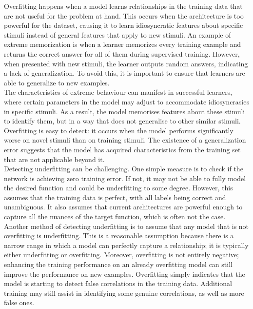 \noindent Overfitting happens when a model learns relationships in the training data that are not useful for the problem at hand. This occurs when the architecture is too powerful for the dataset, causing it to learn idiosyncratic features about specific stimuli instead of general features that apply to new stimuli. An example of extreme memorization is when a learner memorizes every training example and returns the correct answer for all of them during supervised training. However, when presented with new stimuli, the learner outputs random answers, indicating a lack of generalization. To avoid this, it is important to ensure that learners are able to generalize to new examples. \\

\noindent The characteristics of extreme behaviour can manifest in successful learners, where certain parameters in the model may adjust to accommodate idiosyncrasies in specific stimuli. As a result, the model memorises features about these stimuli to identify them, but in a way that does not generalise to other similar stimuli. Overfitting is easy to detect: it occurs when the model performs significantly worse on novel stimuli than on training stimuli. The existence of a generalization error suggests that the model has acquired characteristics from the training set that are not applicable beyond it. \\

\noindent Detecting underfitting can be challenging. One simple measure is to check if the network is achieving zero training error. If not, it may not be able to fully model the desired function and could be underfitting to some degree. However, this assumes that the training data is perfect, with all labels being correct and unambiguous. It also assumes that current architectures are powerful enough to capture all the nuances of the target function, which is often not the case. \\

\noindent Another method of detecting underfitting is to assume that any model that is not overfitting is underfitting. This is a reasonable assumption because there is a narrow range in which a model can perfectly capture a relationship; it is typically either underfitting or overfitting. Moreover, overfitting is not entirely negative; enhancing the training performance on an already overfitting model can still improve the performance on new examples. Overfitting simply indicates that the model is starting to detect false correlations in the training data. Additional training may still assist in identifying some genuine correlations, as well as more false ones. \\

